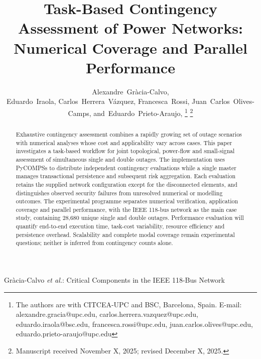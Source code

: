 \documentclass[journal]{IEEEtran}
\begin{document}
\title{Task-Based Contingency Assessment of Power Networks: Numerical Coverage and Parallel Performance}

\author{Alexandre~Gràcia-Calvo,
        
        Eduardo~Iraola, 
        Carlos~Herrera~Vázquez,
        Francesca~Rossi,
        Juan~Carlos~Olives-Camps, 
        and~Eduardo~Prieto-Araujo, %
\thanks{The authors are with CITCEA-UPC and BSC, Barcelona, Spain. E-mail: alexandre.gracia@upc.edu, carlos.herrera.vazquez@upc.edu, eduardo.iraola@bsc.edu, francesca.rossi@upc.edu, juan.carlos.olives@upc.edu, eduardo.prieto-araujo@upc.edu}%
\thanks{Manuscript received November X, 2025; revised December X, 2025.}}

%
{Gr\`acia-Calvo \MakeLowercase{\textit{et al.}}: Critical Components in the IEEE 118-Bus Network}

\maketitle


\begin{abstract}
Exhaustive contingency assessment combines a rapidly growing set of outage scenarios with numerical analyses whose cost and applicability vary across cases. This paper investigates a task-based workflow for joint topological, power-flow and small-signal assessment of simultaneous single and double outages. The implementation uses PyCOMPSs to distribute independent contingency evaluations while a single master manages transactional persistence and subsequent risk aggregation. Each evaluation retains the supplied network configuration except for the disconnected elements, and distinguishes observed security failures from unresolved numerical or modelling outcomes. The experimental programme separates numerical verification, application coverage and parallel performance, with the IEEE 118-bus network as the main case study, containing 28,680 unique single and double outages. Performance evaluation will quantify end-to-end execution time, task-cost variability, resource efficiency and persistence overhead. Scalability and complete modal coverage remain experimental questions; neither is inferred from contingency counts alone.
\end{abstract}
\end{document}
